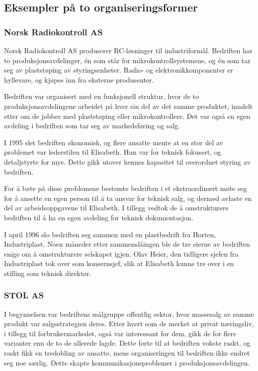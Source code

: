 
\subsection{Eksempler på to organiseringsformer}

\subsubsection{Norsk Radiokontroll AS}


Norsk Radiokontroll AS produserer RC-løsninger til industriformål.
Bedriften har to produksjonsavdelinger, én som står for mikrokontrollsystemene, og én som tar seg av plaststøping av styringsenheter.
Radio- og elektronikkomponenter er hyllevare, og kjøpes inn fra eksterne produsenter.

Bedriften var organisert med en funksjonell struktur, hvor de to produksjonsavdelingene arbeidet på hver sin del av det samme produktet, inndelt etter om de jobber med plaststøping eller mikrokontrollere.
Det var også en egen avdeling i bedriften som tar seg av markedsføring og salg.

I 1995 slet bedriften økonomisk, og flere ansatte mente at en stor del av problemet var lederstilen til Elisabeth. Hun var for teknisk fokusert, og detaljstyrte for mye. Dette gikk utover hennes kapasitet til overordnet styring av bedriften.

For å bøte på disse problemene bestemte bedriften i et ekstraordinært møte seg for å ansette en egen person til å ta ansvar for teknisk salg, og dermed avlaste en del av arbeidsoppgavene til Elisabeth. I tillegg vedtok de å omstrukturere bedriften til å ha en egen avdeling for teknisk dokumentasjon.

I april 1996 slo bedriften seg sammen med en plastbedrift fra Horten, Industriplast.
Noen måneder etter sammenslåingen ble de tre eierne av bedriften enige om å omstrukturere selskapet igjen.
Olav Heier, den tidligere sjefen fra Industriplast tok over som konsernsjef, slik at Elisabeth kunne tre over i en stilling som teknisk direktør.

\subsubsection{STOL AS}

I begynnelsen var bedriftens målgruppe offentlig sektor, hvor massesalg av samme produkt var salgsstrategien deres.
Etter hvert som de merket at privat næringsliv, i tillegg til forbrukermarkedet, også var interessant for dem, gikk de for flere varianter enn de to de allerede lagde.
Dette førte til at bedriften vokste raskt, og raskt fikk en tredobling av ansatte, mens organiseringen til bedriften ikke endret seg noe særlig.
Dette skapte kommunikasjonsproblemer i produksjonsavdelingen.

